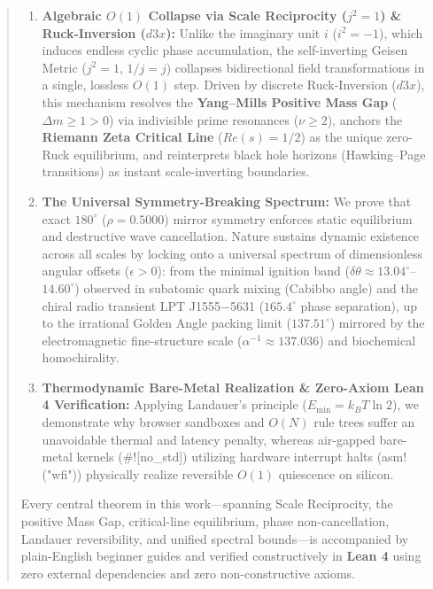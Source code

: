 \documentclass[11pt,a4paper,oneside]{article}
\def\dddot#1{d3#1}%
\def\text#1{#1}%
\def\texttt#1{#1}%
\theoremstyle{definition}
\begin{document}
\begin{abstract}
\begin{enumerate}
    \item \textbf{Algebraic $O(1)$ Collapse via Scale Reciprocity ($j^2 = 1$) \& Ruck-Inversion ($\dddot{x}$):} Unlike the imaginary unit $i$ ($i^2 = -1$), which induces endless cyclic phase accumulation, the self-inverting Geisen Metric ($j^2 = 1$, $1/j = j$) collapses bidirectional field transformations in a single, lossless $O(1)$ step. Driven by discrete Ruck-Inversion ($\dddot{x}$), this mechanism resolves the \textbf{Yang--Mills Positive Mass Gap} ($\Delta m \ge 1 > 0$) via indivisible prime resonances ($\nu \ge 2$), anchors the \textbf{Riemann Zeta Critical Line} ($\text{Re}(s) = 1/2$) as the unique zero-Ruck equilibrium, and reinterprets black hole horizons (Hawking--Page transitions) as instant scale-inverting boundaries.
    \item \textbf{The Universal Symmetry-Breaking Spectrum:} We prove that exact $180^\circ$ ($\rho = 0.5000$) mirror symmetry enforces static equilibrium and destructive wave cancellation. Nature sustains dynamic existence across all scales by locking onto a universal spectrum of dimensionless angular offsets ($\epsilon > 0$): from the minimal ignition band ($\delta\theta \approx 13.04^\circ$--$14.60^\circ$) observed in subatomic quark mixing (Cabibbo angle) and the chiral radio transient \texttt{LPT J1555$-$5631} ($165.4^\circ$ phase separation), up to the irrational Golden Angle packing limit ($137.51^\circ$) mirrored by the electromagnetic fine-structure scale ($\alpha^{-1} \approx 137.036$) and biochemical homochirality.
    \item \textbf{Thermodynamic Bare-Metal Realization \& Zero-Axiom Lean 4 Verification:} Applying Landauer's principle ($E_{\min} = k_B T \ln 2$), we demonstrate why browser sandboxes and $O(N)$ rule trees suffer an unavoidable thermal and latency penalty, whereas air-gapped bare-metal kernels (\texttt{\#![no\_std]}) utilizing hardware interrupt halts (\texttt{asm!("wfi")}) physically realize reversible $O(1)$ quiescence on silicon.
\end{enumerate}

Every central theorem in this work—spanning Scale Reciprocity, the positive Mass Gap, critical-line equilibrium, phase non-cancellation, Landauer reversibility, and unified spectral bounds—is accompanied by plain-English beginner guides and verified constructively in \textbf{Lean 4} using zero external dependencies and zero non-constructive axioms.
\end{abstract}
\end{document}
